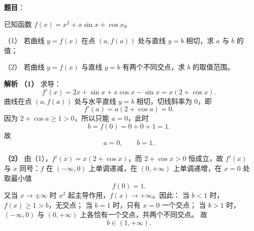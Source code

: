\begin{answer}

\textbf{题目}：

已知函数 $f(x)=x^2+x\sin x+\cos x$。

（1） 若曲线 $y=f(x)$ 在点 $(a,f(a))$ 处与直线 $y=b$ 相切，求 $a$ 与 $b$ 的值；

（2） 若曲线 $y=f(x)$ 与直线 $y=b$ 有两个不同交点，求 $b$ 的取值范围。

\textbf{解析}
\textbf{（1）} 求导：
\nopagebreak[4]
\[f'(x)=2x+\sin x+x\cos x-\sin x=x(2+\cos x).\]
曲线在点 $(a,f(a))$ 处与水平直线 $y=b$ 相切，切线斜率为 $0$，即
\nopagebreak[4]
\[f'(a)=a(2+\cos a)=0.\]
因为 $2+\cos a\geqslant1>0$，所以只能 $a=0$，此时
\nopagebreak[4]
\[b=f(0)=0+0+1=1.\]
故
\nopagebreak[4]
\[a=0,\qquad b=1.\]

\textbf{（2）} 由（1），$f'(x)=x(2+\cos x)$，而 $2+\cos x>0$ 恒成立，故 $f'(x)$ 与 $x$ 同号：$f$ 在 $(-\infty,0)$ 上单调递减，在 $(0,+\infty)$ 上单调递增，在 $x=0$ 处取最小值
\nopagebreak[4]
\[f(0)=1.\]
又当 $x\to\pm\infty$ 时 $x^2$ 起主导作用，$f(x)\to+\infty$。因此：
当 $b<1$ 时，$f(x)\geqslant1>b$，无交点；
当 $b=1$ 时，只有 $x=0$ 一个交点；
当 $b>1$ 时，$(-\infty,0)$ 与 $(0,+\infty)$ 上各恰有一个交点，共两个不同交点。
故
\nopagebreak[4]
\[b\in(1,+\infty).\]



\end{answer}
